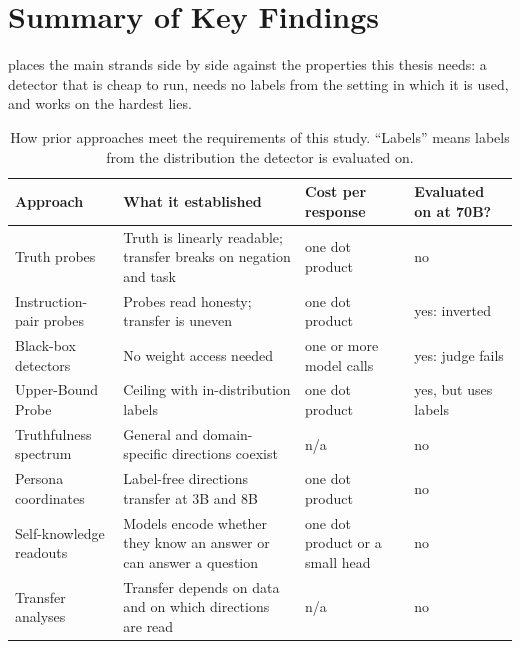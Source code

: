 \section{Summary of Key Findings}
\label{sec:lit-summary}

 places the main strands side by side against the properties this thesis needs: a
detector that is cheap to run, needs no labels from the setting in which it is used, and works on the
hardest lies.

\begin{table}[t]
\centering
\small
\caption{How prior approaches meet the requirements of this study. ``Labels'' means labels from
the distribution the detector is evaluated on.}
\label{tab:lit}
\begin{tabularx}{\linewidth}{@{}>{\raggedright\arraybackslash}p{3.3cm}>{\raggedright\arraybackslash}X>{\raggedright\arraybackslash}p{2.3cm}>{\raggedright\arraybackslash}p{2.6cm}@{}}
\toprule
Approach & What it established & Cost per response & Evaluated on \hpkr{} at 70B? \\
\midrule
Truth probes \cite{marks2023geometry,buerger2024truth} & Truth is linearly readable; transfer breaks
on negation and task & one dot product & no \\
Instruction-pair probes \cite{zou2023representation,goldowskydill2025detecting} & Probes read
honesty; transfer is uneven & one dot product & yes: inverted \\
Black-box detectors \cite{pacchiardi2023catch,kretschmar2025liars} & No weight access needed &
one or more model calls & yes: judge fails \\
Upper-Bound Probe \cite{kretschmar2025liars} & Ceiling with in-distribution labels & one dot
product & yes, but uses \hpkr{} labels \\
Truthfulness spectrum \cite{ying2026truthfulness} & General and domain-specific directions coexist &
n/a & no \\
Persona coordinates \cite{mahadik2026persona} & Label-free directions transfer at 3B and 8B & one
dot product & no \\
Self-knowledge readouts \cite{kadavath2022language,slobodkin2023curious,gottesman2024estimating,ferrando2025know}
& Models encode whether they know an answer or can answer a question & one dot product or a small head
& no \\
Transfer analyses \cite{kirch2025offpolicy,natarajan2026targeted,yoo2026subspace} & Transfer
depends on data and on which directions are read & n/a & no \\
\bottomrule
\end{tabularx}
\end{table}

